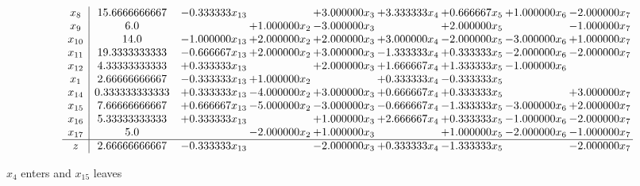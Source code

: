 \documentclass[10pt]{article}
\begin{document}
 \[\begin{array}{c| c c@{\hskip 2pt} c@{\hskip 2pt} c@{\hskip 2pt} c@{\hskip 2pt} c@{\hskip 2pt} c@{\hskip 2pt} c@{\hskip 2pt} }
 x_{8}   &  15.6666666667 & -0.333333 x_{13} &   & + 3.000000 x_{3} & + 3.333333 x_{4} & + 0.666667 x_{5} & + 1.000000 x_{6} & -2.000000 x_{7}\\
 x_{9}   &  6.0  &   & + 1.000000 x_{2} & -3.000000 x_{3} &   & + 2.000000 x_{5} &   & -1.000000 x_{7}\\
 x_{10}   &  14.0 & -1.000000 x_{13} & + 2.000000 x_{2} & + 2.000000 x_{3} & + 3.000000 x_{4} & -2.000000 x_{5} & -3.000000 x_{6} & + 1.000000 x_{7}\\
 x_{11}   &  19.3333333333 & -0.666667 x_{13} & + 2.000000 x_{2} & + 3.000000 x_{3} & -1.333333 x_{4} & + 0.333333 x_{5} & -2.000000 x_{6} & -2.000000 x_{7}\\
 x_{12}   &  4.33333333333 & + 0.333333 x_{13} &   & + 2.000000 x_{3} & + 1.666667 x_{4} & + 1.333333 x_{5} & -1.000000 x_{6} &   \\
 x_{1}   &  2.66666666667 & -0.333333 x_{13} & + 1.000000 x_{2} &   & + 0.333333 x_{4} & -0.333333 x_{5} &    &   \\
 x_{14}   &  0.333333333333 & + 0.333333 x_{13} & -4.000000 x_{2} & + 3.000000 x_{3} & + 0.666667 x_{4} & + 0.333333 x_{5} &   & + 3.000000 x_{7}\\
 x_{15}   &  7.66666666667 & + 0.666667 x_{13} & -5.000000 x_{2} & -3.000000 x_{3} & -0.666667 x_{4} & -1.333333 x_{5} & -3.000000 x_{6} & + 2.000000 x_{7}\\
 x_{16}   &  5.33333333333 & + 0.333333 x_{13} &   & + 1.000000 x_{3} & + 2.666667 x_{4} & + 0.333333 x_{5} & -1.000000 x_{6} & -2.000000 x_{7}\\
 x_{17}   &  5.0  &   & -2.000000 x_{2} & + 1.000000 x_{3} &   & + 1.000000 x_{5} & -2.000000 x_{6} & -1.000000 x_{7}\\
\hline
z    &  2.66666666667 & -0.333333 x_{13} &   & -2.000000 x_{3} & + 0.333333 x_{4} & -1.333333 x_{5} &   & -2.000000 x_{7}\\
\end{array}\]


 $ x_{4} $ enters and $ x_{15} $ leaves 
\end{document}
